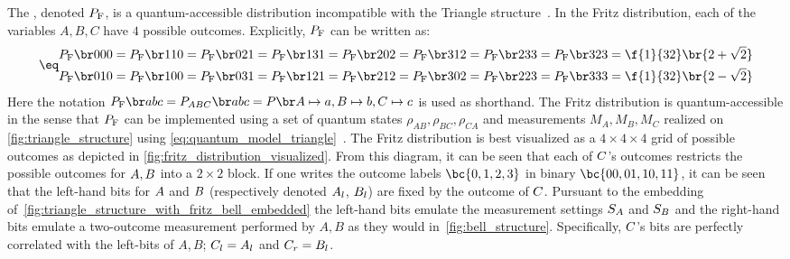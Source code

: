 \documentclass[aps, 10pt, english, twoside, pra, nofootinbib, tightenlines, longbibliography, superscriptaddress]{revtex4-1}
\begin{document}
    The , denoted $\prob[\fritz]$, is a quantum-accessible distribution incompatible with the Triangle structure~\cite{Fritz_2012}. In the Fritz distribution, each of the variables $A,B,C$ have $4$ possible outcomes. Explicitly, $\prob[\fritz]$ can be written as:
    \begin{align*}
    \eq \label{eq:fritz_dist}
    \begin{split}
        \prob[\fritz][000] = \prob[\fritz][110] = \prob[\fritz][021] = \prob[\fritz][131] = \prob[\fritz][202] = \prob[\fritz][312] = \prob[\fritz][233] = \prob[\fritz][323] &= \f{1}{32}\br{2 + \sqrt{2}} \\
        \prob[\fritz][010] = \prob[\fritz][100] = \prob[\fritz][031] = \prob[\fritz][121] = \prob[\fritz][212] = \prob[\fritz][302] = \prob[\fritz][223] = \prob[\fritz][333] &= \f{1}{32}\br{2 - \sqrt{2}}
    \end{split}
    \end{align*}
    Here the notation $\prob[\fritz][abc] = \prob[\p{ABC}][abc] = \prob[][\p A\mapsto a,\p B\mapsto b,\p C\mapsto c]$ is used as shorthand. The Fritz distribution is quantum-accessible in the sense that $\prob[\fritz]$ can be implemented using a set of quantum states $\rho_{AB}, \rho_{BC}, \rho_{CA}$ and measurements $M_A, M_B, M_C$ realized on \cref{fig:triangle_structure} using \cref{eq:quantum_model_triangle}~\cite{Fritz_2012}. The Fritz distribution is best visualized as a $4 \times 4 \times 4$ grid of possible outcomes as depicted in \cref{fig:fritz_distribution_visualized}. From this diagram, it can be seen that each of $C$'s outcomes restricts the possible outcomes for $A,B$ into a $2 \times 2$ block. If one writes the outcome labels $\bc{0,1,2,3}$ in binary $\bc{00,01,10,11}$, it can be seen that the left-hand bits for $A$ and $B$ (respectively denoted $A_l$, $B_l$) are fixed by the outcome of $C$. Pursuant to the embedding of~\cref{fig:triangle_structure_with_fritz_bell_embedded} the left-hand bits emulate the measurement settings $S_{A}$ and $S_{B}$ and the right-hand bits emulate a two-outcome measurement performed by $A, B$ as they would in~\cref{fig:bell_structure}. Specifically, $C$'s bits are perfectly correlated with the left-bits of $A,B$; $C_l = A_l$ and $C_r = B_l$.
\end{document}
